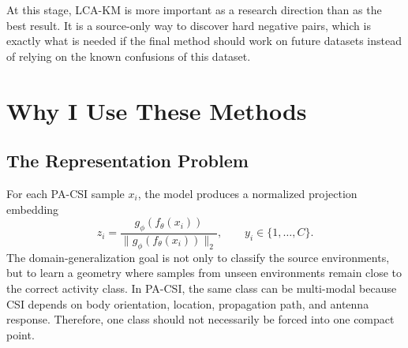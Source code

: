 \documentclass[11pt]{article}
\begin{document}
\begin{table}[H]
\centering
\small
\caption{Adaptive K-margin experiments available in the current workspace.}
\label{tab:lcakm}
%
\end{table}

At this stage, LCA-KM is more important as a research direction than as the best result. It is a source-only way to discover hard negative pairs, which is exactly what is needed if the final method should work on future datasets instead of relying on the known confusions of this dataset.

\section{Why I Use These Methods}

\subsection{The Representation Problem}

For each PA-CSI sample $x_i$, the model produces a normalized projection embedding
\[
z_i = \frac{g_\phi(f_\theta(x_i))}{\|g_\phi(f_\theta(x_i))\|_2},
\qquad
y_i \in \{1,\dots,C\}.
\]
The domain-generalization goal is not only to classify the source environments, but to learn a geometry where samples from unseen environments remain close to the correct activity class. In PA-CSI, the same class can be multi-modal because CSI depends on body orientation, location, propagation path, and antenna response. Therefore, one class should not necessarily be forced into one compact point.
\end{document}
